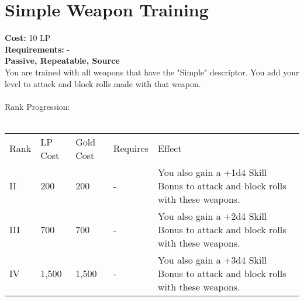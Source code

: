 \section{Simple Weapon Training}\label{perk:simpleWeaponTraining}
\textbf{Cost:} 10 LP\\
\textbf{Requirements:} -\\
\textbf{Passive, Repeatable, Source}\\
You are trained with all weapons that have the "Simple" descriptor.
You add your level to attack and block rolls made with that weapon.\\
\\
Rank Progression:\\
\\
\begin{longtable}{l | l | l | l | p{9cm}}
	Rank & LP Cost & Gold Cost & Requires & Effect\\
	II & 200 & 200 & - & You also gain a +1d4 Skill Bonus to attack and block rolls with these weapons.\\
	III & 700 & 700 & - & You also gain a +2d4 Skill Bonus to attack and block rolls with these weapons.\\
	IV & 1,500 & 1,500 & - & You also gain a +3d4 Skill Bonus to attack and block rolls with these weapons.\\
\end{longtable}